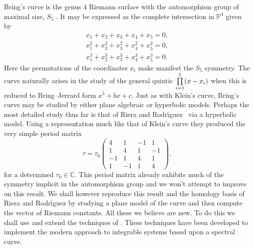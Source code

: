 \documentclass[pdftex]{sigma}
\numberwithin{equation}{section}
\begin{document}
Bring's curve is the genus 4 Riemann surface with the automorphism group
of maximal size, $S_5$ \cite{breuer, edge78, edge81, weber05}. It may be expressed as the
complete intersection in $\mathbb{P}^4$ given by
\begin{gather*}
  x_1 + x_2 + x_3 + x_4 + x_5  = 0, \\
  x_1^2 + x_2^2 + x_3^2 + x_4^2 + x_5^2  = 0, \\
  x_1^3 + x_2^3 + x_3^3 + x_4^3 + x_5^3  = 0.
\end{gather*}
Here the permutations of the coordinates
$x_i$ make manifest the $S_5$ symmetry. The curve naturally arises in the study of the
general quintic $\prod\limits_{i=1}\sp5(x-x_i)$ when this is reduced to Bring--Jerrard form $x^5+bx+c$.
Just as with Klein's curve, Bring's curve
may be studied by either plane algebraic or hyperbolic models. Perhaps the most detailed study thus far
is that of Riera and Rodr{\'{\i}}guez~\cite{riera} via a hyperbolic model. Using a
representation much like that of Klein's curve they produced the very
simple period matrix
\begin{equation}\label{RRstau}
  \tau = \tau_0
  \begin{pmatrix}
    4 & 1 & -1 & 1 \\
    1 & 4 & 1 & -1 \\
    -1 & 1 & 4 & 1 \\
    1 & -1 & 1 & 4
  \end{pmatrix},
\end{equation}
for a determined $\tau_0\in\mathbb{C}$. This period matrix already
exhibits much of the symmetry implicit in the automorphism group and
we won't attempt to improve on this result. We shall however reproduce this result
and the homology basis of Riera and Rodr{\'{\i}}guez by studying a plane model of the curve
and then compute the vector of Riemann constants.
All these we believe are new. To do this we shall use and extend the techniques of \cite{bn10}.
These techniques have been developed to implement the modern approach to integrable systems
based upon a spectral curve.
\end{document}
